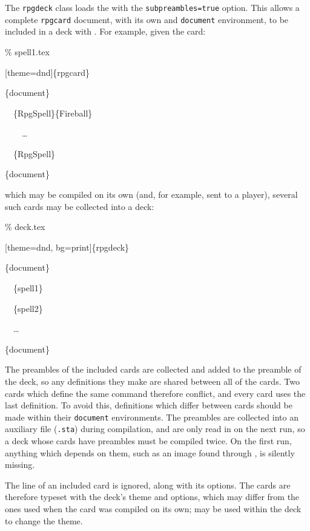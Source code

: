 			The \texttt{rpgdeck} class loads the  with the \texttt{subpreambles=true} option. This allows a complete \texttt{rpgcard} document, with its own  and \texttt{document} environment, to be included in a deck with . For example, given the card:
			\begin{Code}
				\% spell1.tex

				[theme=dnd]\{rpgcard\}

				\{document\}

				~~\{RpgSpell\}\{Fireball\}

				~~~~\ldots

				~~\{RpgSpell\}

				\{document\}
			\end{Code}
			which may be compiled on its own (and, for example, sent to a player), several such cards may be collected into a deck:
			\begin{Code}
				\% deck.tex

				[theme=dnd, bg=print]\{rpgdeck\}

				\{document\}

				~~\cmd*{input}\{spell1\}

				~~\cmd*{input}\{spell2\}

				~~\ldots

				\{document\}
			\end{Code}

			The preambles of the included cards are collected and added to the preamble of the deck, so any definitions they make are shared between all of the cards. Two cards which define the same command therefore conflict, and every card uses the last definition. To avoid this, definitions which differ between cards should be made within their \texttt{document} environments. The preambles are collected into an auxiliary file (\texttt{.sta}) during compilation, and are only read in on the next run, so a deck whose cards have preambles must be compiled twice. On the first run, anything which depends on them, such as an image found through , is silently missing.

			The  line of an included card is ignored, along with its options. The cards are therefore typeset with the deck's theme and options, which may differ from the ones used when the card was compiled on its own;  may be used within the deck to change the theme.
